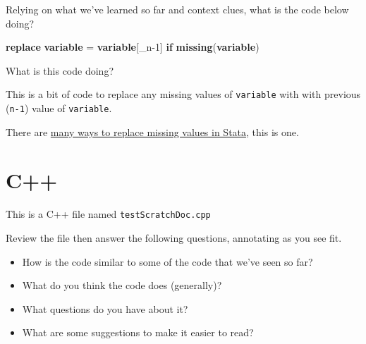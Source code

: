 \documentclass[
]{book}
\newenvironment{Shaded}{\begin{snugshade}}{\end{snugshade}}
\newcommand{\DataTypeTok}[1]{\textcolor[rgb]{0.13,0.29,0.53}{#1}}
\newcommand{\FunctionTok}[1]{\textcolor[rgb]{0.13,0.29,0.53}{\textbf{#1}}}
\newcommand{\KeywordTok}[1]{\textcolor[rgb]{0.13,0.29,0.53}{\textbf{#1}}}
\newcommand{\NormalTok}[1]{#1}
\providecommand{\tightlist}{%
  \setlength{\itemsep}{0pt}\setlength{\parskip}{0pt}}
\begin{document}
Relying on what we've learned so far and context clues, what is the code below doing?

\begin{Shaded}
\begin{Highlighting}[]
\KeywordTok{replace} \KeywordTok{variable}\NormalTok{ = }\KeywordTok{variable}\NormalTok{[}\DataTypeTok{\_n}\NormalTok{{-}1] }\KeywordTok{if} \FunctionTok{missing}\NormalTok{(}\KeywordTok{variable}\NormalTok{)}
\end{Highlighting}
\end{Shaded}

What is this code doing?

This is a bit of code to replace any missing values of \texttt{variable} with with previous (\texttt{n-1}) value of \texttt{variable}.

There are \href{https://www.stata.com/support/faqs/data-management/replacing-missing-values/}{many ways to replace missing values in Stata}, this is one.

\section{C++}\label{c}

This is a C++ file named \texttt{testScratchDoc.cpp}

Review the file then answer the following questions, annotating as you see fit.

\begin{itemize}
\tightlist
\item
  How is the code similar to some of the code that we've seen so far?
\item
  What do you think the code does (generally)?
\item
  What questions do you have about it?
\item
  What are some suggestions to make it easier to read?
\end{itemize}
\end{document}
